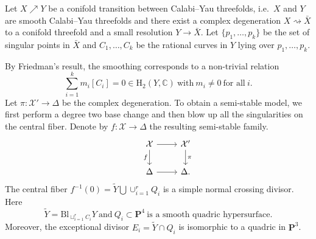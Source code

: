\begin{instance}
    Let \(X\nearrow Y\) be a conifold transition
    between Calabi--Yau threefolds, i.e.~\(X\) and \(Y\) are smooth
    Calabi--Yau threefolds and there exist
    a complex degeneration \(X\rightsquigarrow \bar{X}\)
    to a conifold threefold and a small resolution \(Y\to \bar{X}\). 
    Let \(\{p_{1},\ldots,p_{k}\}\) be the set of singular points in \(\bar{X}\)
    and \(C_{1},\ldots,C_{k}\) be the rational curves in \(Y\) 
    lying over \(p_{1},\ldots,p_{k}\).

    By Friedman's result, the smoothing corresponds to a non-trivial relation
    \begin{equation*}
        \sum_{i=1}^{k} m_{i}[C_{i}] = 0 \in\mathrm{H}_{2}(Y,\mathbb{C})~\mbox{with}~m_{i}\ne 0~\mbox{for all}~i.
    \end{equation*}
    Let \(\pi\colon\mathcal{X}'\to\Delta\) be the 
    complex degeneration. To obtain a semi-stable model, we first perform a degree two base change and 
    then blow up all the singularities on the central fiber. 
    Denote by \(f\colon \mathcal{X}\to \Delta\)
    the resulting semi-stable family.
    \begin{equation*}
    \begin{tikzcd}
        &\mathcal{X}\ar[r]\ar[d,"f"']&\mathcal{X}'\ar[d,"\pi"]\\
        &\Delta\ar[r] &\Delta.
    \end{tikzcd}    
    \end{equation*}
    The central fiber \(f^{-1}(0)=\tilde{Y}\bigcup \cup_{i=1}^{r} Q_{i}\)
    is a simple normal crossing divisor. 
    Here
    \begin{equation*}
        \tilde{Y} = \mathrm{Bl}_{\sqcup_{i=1}^{r} C_{i}} Y~\mbox{and}~Q_{i}\subset \mathbf{P}^{4}~\mbox{is
        a smooth quadric hypersurface}.
    \end{equation*}
    Moreover, the exceptional divisor \(E_{i}=\tilde{Y}\cap Q_{i}\) is 
    isomorphic to a quadric in \(\mathbf{P}^{3}\).


\end{instance}
